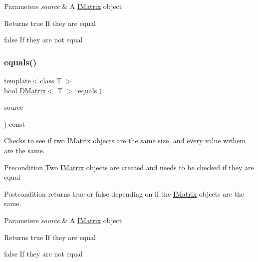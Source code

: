 \begin{DoxyParams}{Parameters}
{\em source} & A \mbox{\hyperlink{class_i_matrix}{I\+Matrix}} object \\
\hline
\end{DoxyParams}
\begin{DoxyReturn}{Returns}
true If they are equal 

false If they are not equal 
\end{DoxyReturn}
\mbox{\label{class_d_matrix_aab5e553e6c6222238be1b52ee044848f}} 
\subsubsection{\texorpdfstring{equals()}{equals()}\hspace{0.1cm}{\footnotesize\ttfamily [3/6]}}
{\footnotesize\ttfamily template$<$class T $>$ \\
bool \mbox{\hyperlink{class_d_matrix}{D\+Matrix}}$<$ T $>$\+::equals (\begin{DoxyParamCaption}\item[{const \mbox{\hyperlink{class_i_matrix}{I\+Matrix}}$<$ \mbox{\hyperlink{class_l_matrix}{L\+Matrix}}$<$ T $>$, T $>$ \&}]{source }\end{DoxyParamCaption}) const}



Checks to see if two \mbox{\hyperlink{class_i_matrix}{I\+Matrix}} objects are the same size, and every value withem are the same. 

\begin{DoxyPrecond}{Precondition}
Two \mbox{\hyperlink{class_i_matrix}{I\+Matrix}} objects are created and needs to be checked if they are equal 
\end{DoxyPrecond}
\begin{DoxyPostcond}{Postcondition}
returns true or false depending on if the \mbox{\hyperlink{class_i_matrix}{I\+Matrix}} objects are the same.
\end{DoxyPostcond}

\begin{DoxyParams}{Parameters}
{\em source} & A \mbox{\hyperlink{class_i_matrix}{I\+Matrix}} object \\
\hline
\end{DoxyParams}
\begin{DoxyReturn}{Returns}
true If they are equal 

false If they are not equal 
\end{DoxyReturn}
\mbox{\label{class_d_matrix_a6ca57f0b529b46fd7b2a12d43f425348}} 
